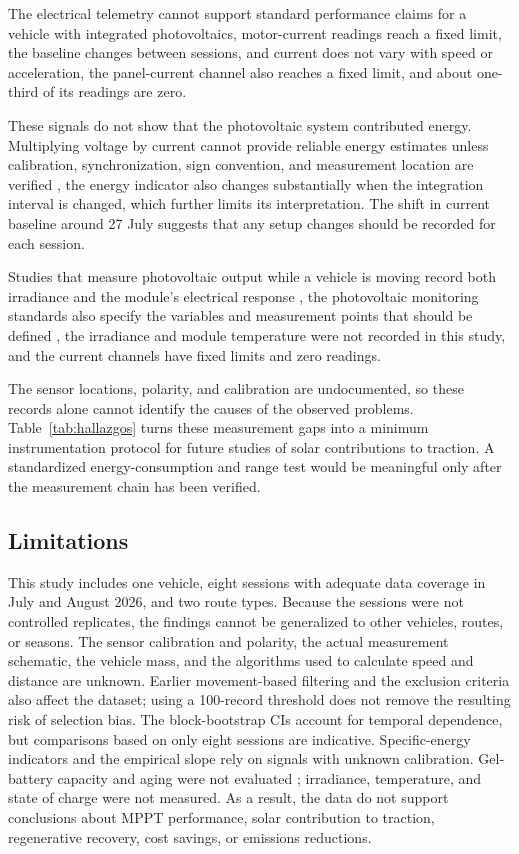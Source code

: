 \documentclass[vehicles,article,submit,moreauthors]{Definitions/mdpi}
\begin{document}
The electrical telemetry cannot support standard performance claims for a vehicle with integrated photovoltaics, motor-current readings reach a fixed limit, the baseline changes between sessions, and current does not vary with speed or acceleration, the panel-current channel also reaches a fixed limit, and about one-third of its readings are zero.

These signals do not show that the photovoltaic system contributed energy. Multiplying voltage by current cannot provide reliable energy estimates unless calibration, synchronization, sign convention, and measurement location are verified \citep{ref-nist,ref-gum}, the energy indicator also changes substantially when the integration interval is changed, which further limits its interpretation. The shift in current baseline around 27 July suggests that any setup changes should be recorded for each session.

Studies that measure photovoltaic output while a vehicle is moving record both irradiance and the module's electrical response \citep{ref-wetzel,ref-ng,ref-ota-irradiance,ref-ota-driving}, the photovoltaic monitoring standards also specify the variables and measurement points that should be defined \citep{ref-iec61724}, the irradiance and module temperature were not recorded in this study, and the current channels have fixed limits and zero readings.

The sensor locations, polarity, and calibration are undocumented, so these records alone cannot identify the causes of the observed problems. Table~\ref{tab:hallazgos} turns these measurement gaps into a minimum instrumentation protocol for future studies of solar contributions to traction. A standardized energy-consumption and range test \citep{ref-sae1634} would be meaningful only after the measurement chain has been verified.

\subsection{Limitations}

This study includes one vehicle, eight sessions with adequate data coverage in July and August 2026, and two route types. Because the sessions were not controlled replicates, the findings cannot be generalized to other vehicles, routes, or seasons. The sensor calibration and polarity, the actual measurement schematic, the vehicle mass, and the algorithms used to calculate speed and distance are unknown. Earlier movement-based filtering and the exclusion criteria also affect the dataset; using a 100-record threshold does not remove the resulting risk of selection bias. The block-bootstrap CIs account for temporal dependence, but comparisons based on only eight sessions are indicative. Specific-energy indicators and the empirical slope rely on signals with unknown calibration. Gel-battery capacity and aging were not evaluated \citep{ref-ruetschi}; irradiance, temperature, and state of charge were not measured. As a result, the data do not support conclusions about MPPT performance, solar contribution to traction, regenerative recovery, cost savings, or emissions reductions.
\end{document}
